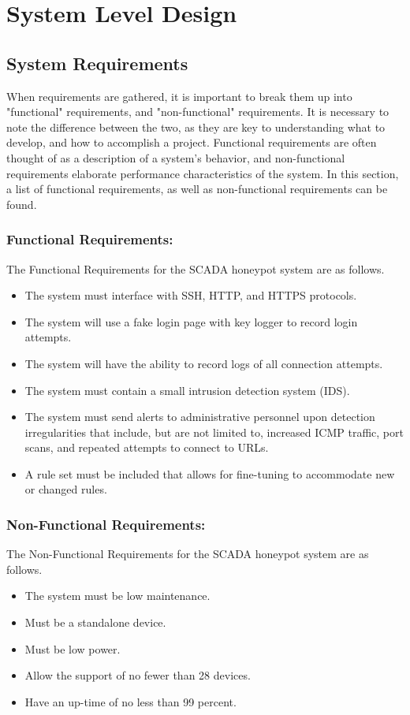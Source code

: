 \chapter{System Level Design}

\section{System Requirements}
When requirements are gathered, it is important to break them up into "functional" requirements, and "non-functional" requirements. It is necessary to note the difference between the two, as they are key to understanding what to develop, and how to accomplish a project. Functional requirements are often thought of as a description of a system's behavior, and non-functional requirements elaborate performance characteristics of the system. In this section, a list of functional requirements, as well as non-functional requirements can be found.

\subsection{Functional Requirements:}
The Functional Requirements for the SCADA honeypot system are as follows.
\begin{itemize}
\item The system must interface with SSH, HTTP, and HTTPS protocols.
\item The system will use a fake login page with key logger to record login attempts.
\item The system will  have the ability to record logs of all connection attempts.
\item The system must contain a small intrusion detection system (IDS).
\item The system must send alerts to administrative personnel upon detection irregularities that include, but are not limited to, increased ICMP traffic, port scans, and repeated attempts to connect to URLs.
\item A rule set must be included that allows for fine-tuning to accommodate new or changed rules.
\end{itemize}

\subsection{Non-Functional Requirements:}
The Non-Functional Requirements for the SCADA honeypot system are as follows.
\begin{itemize}
\item The system must be low maintenance.
\item Must be a standalone device.
\item Must be low power.
\item Allow the support of no fewer than 28 devices.
\item Have an up-time of no less than 99 percent.
\end{itemize}

